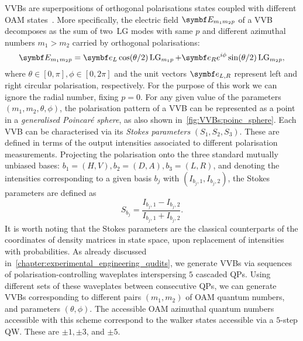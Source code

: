 \acfp{VVB} are superpositions of orthogonal polarisations states coupled with different \ac{OAM} states~\cite{padgett2004lights}.
More specifically, the electric field $\bs{E}_{m_1m_2p}$ of a \ac{VVB} decomposes as the sum of two~\ac{LG} modes with same $p$ and different azimuthal numbers $m_1>m_2$ carried by orthogonal polarisations:
\begin{equation}
	\bs{E}_{m_1m_2p} =
	\bs{e}_L \cos(\theta/2)\on{LG}_{m_1p} +
	\bs{e}_R e^{i \phi} \sin(\theta/2)\on{LG}_{m_2p},
\end{equation}
where $\theta\in[0,\pi], \phi\in[0,2\pi]$ and the unit vectors $\bs{e}_{L,R}$ represent left and right circular polarisation, respectively.
For the purpose of this work we can ignore the radial number, fixing $p=0$.
For any given value of the parameters $(m_1, m_2, \theta, \phi)$, the polarisation pattern of a \ac{VVB} can be represented as a point in a \emph{generalised Poincar\'e sphere}, as also shown in~\cref{fig:VVBs:poinc_sphere}.
Each VVB can be characterised via its \emph{Stokes parameters} $(S_1,S_2,S_3)$.
These are defined in terms of the output intensities associated to different polarisation measurements.
Projecting the polarisation onto the three standard mutually unbiased bases: $b_1=(H,V), b_2=(D,A), b_3=(L,R)$, and denoting the intensities corresponding to a given basis $b_j$ with $(I_{b_j,1},I_{b_j,2})$, the Stokes parameters are defined as
\begin{equation}
	S_{b_j} = \frac{I_{b_j,1}-I_{b_j,2}}{I_{b_j,1}+I_{b_j,2}}.
\end{equation}
It is worth noting that the Stokes parameters are the classical counterparts of the coordinates of density matrices in state space, upon replacement of intensities with probabilities.
As already discussed in~\cref{chapter:experimental_engineering_qudits}, we generate VVBs via sequences of polarisation-controlling waveplates interspersing $5$ cascaded QPs.
Using different sets of these waveplates between consecutive QPs, we can generate VVBs corresponding to different pairs $(m_1,m_2)$ of OAM quantum numbers, and parameters $(\theta, \phi)$.
The accessible OAM azimuthal quantum numbers accessible with this scheme correspond to the walker states accessible via a $5$-step QW. These are $\pm1,\pm3$, and $\pm5$.

